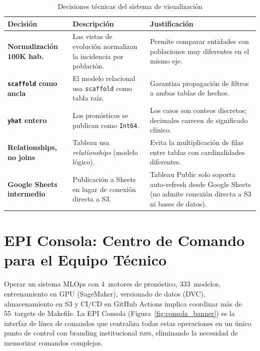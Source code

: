 \documentclass[12pt, letterpaper]{article}
\newcommand{\imss}{\textnormal{\textsc{imss}}}
\newcommand{\figref}[1]{Figura~\ref{#1}}
\begin{document}
\begin{table}[H]
\centering
\caption{Decisiones técnicas del sistema de visualización}
\label{tab:decisiones_dashboard}
\scriptsize
{}
\begin{tabularx}{\textwidth}{>{\bfseries}p{3cm} X X}
\toprule
\textbf{Decisión} & \textbf{Descripción} & \textbf{Justificación} \\
\midrule
Normalización 100K hab. & Las vistas de evolución normalizan la incidencia por población. & Permite comparar entidades con poblaciones muy diferentes en el mismo eje. \\
\addlinespace
\texttt{scaffold} como ancla & El modelo relacional usa \texttt{scaffold} como tabla raíz. & Garantiza propagación de filtros a ambas tablas de hechos. \\
\addlinespace
\texttt{yhat} entero & Los pronósticos se publican como \texttt{Int64}. & Los casos son conteos discretos; decimales carecen de significado clínico. \\
\addlinespace
Relationships, no joins & Tableau usa \textit{relationships} (modelo lógico). & Evita la multiplicación de filas entre tablas con cardinalidades diferentes. \\
\addlinespace
Google Sheets intermedio & Publicación a Sheets en lugar de conexión directa a S3. & Tableau Public solo soporta auto-refresh desde Google Sheets (no admite conexión directa a S3 ni bases de datos). \\
\bottomrule
\end{tabularx}
\end{table}

\newpage
\section{EPI Consola: Centro de Comando para el Equipo Técnico}\label{sec:consola}

Operar un sistema MLOps con 4~motores de pronóstico, 333~modelos, entrenamiento en GPU (SageMaker), versionado de datos (DVC), almacenamiento en S3 y CI/CD en GitHub Actions implica coordinar más de 55~targets de Makefile. La EPI Consola (\figref{fig:consola_banner}) es la interfaz de línea de comandos que centraliza todas estas operaciones en un único punto de control con branding institucional \imss{}, eliminando la necesidad de memorizar comandos complejos.
\end{document}
